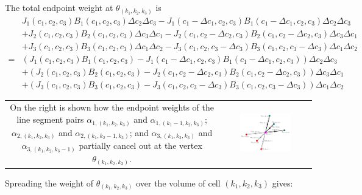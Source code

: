 The total endpoint weight at \(\theta_{(k_1, k_2, k_3)}\) is 
\begin{align*}
& J_1(c_1,c_2,c_3) B_1(c_1, c_2, c_3) \Delta c_2 \Delta c_3 - J_1(c_1 - \Delta c_1,c_2,c_3) B_1(c_1 - \Delta c_1, c_2, c_3) \Delta c_2 \Delta c_3 \\ 
& + J_2(c_1,c_2,c_3) B_2(c_1, c_2, c_3) \Delta c_3 \Delta c_1 - J_2(c_1,c_2 - \Delta c_2,c_3) B_2(c_1, c_2 - \Delta c_2, c_3) \Delta c_3 \Delta c_1 \\
& + J_3(c_1,c_2,c_3) B_3(c_1, c_2, c_3) \Delta c_1 \Delta c_2 - J_3(c_1,c_2,c_3 - \Delta c_3) B_3(c_1, c_2, c_3 - \Delta c_3) \Delta c_1 \Delta c_2 \\
= & (J_1(c_1,c_2,c_3) B_1(c_1, c_2, c_3) - J_1(c_1 - \Delta c_1,c_2,c_3) B_1(c_1 - \Delta c_1, c_2, c_3)) \Delta c_2 \Delta c_3 \\ 
& + (J_2(c_1,c_2,c_3) B_2(c_1, c_2, c_3) - J_2(c_1,c_2 - \Delta c_2,c_3) B_2(c_1, c_2 - \Delta c_2, c_3)) \Delta c_3 \Delta c_1 \\ 
& + (J_3(c_1,c_2,c_3) B_3(c_1, c_2, c_3) - J_3(c_1,c_2,c_3 - \Delta c_3) B_3(c_1, c_2, c_3 - \Delta c_3)) \Delta c_1 \Delta c_2  
\end{align*}

\begin{tabular}{cc}
\parbox{0.4\textwidth}{
On the right is shown how the endpoint weights of the line segment pairs \(\alpha_{1,(k_1,k_2,k_3)}\) and \(\alpha_{1,(k_1-1,k_2,k_3)}\); \(\alpha_{2,(k_1,k_2,k_3)}\) and \(\alpha_{2,(k_1,k_2-1,k_3)}\); and \(\alpha_{3,(k_1,k_2,k_3)}\) and \(\alpha_{3,(k_1,k_2,k_3-1)}\) partially cancel out at the vertex \(\theta_{(k_1,k_2,k_3)}\).
} & \parbox{0.6\textwidth}{
\includegraphics[width = 0.6\textwidth]{Coordinate_systems/path_endpoint_cell}
}
\end{tabular}

Spreading the weight of \(\theta_{(k_1, k_2, k_3)}\) over the volume of cell \((k_1, k_2, k_3)\) gives:

